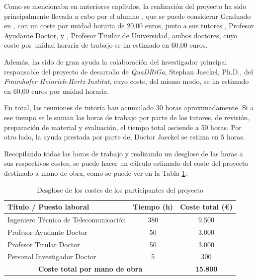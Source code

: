 Como se mencionaba en anteriores capítulos, la realización del proyecto ha sido principalmente llevada a cabo por el alumno \myName, que se puede considerar Graduado en \myDegree, con un coste por unidad horaria de 20,00 euros, junto a sus tutores \myProf, Profesor Ayudante Doctor, y \myOtherProf, Profesor Titular de Universidad, ambos doctores, cuyo coste por unidad horaria de trabajo se ha estimado en 60,00 euros.

Además, ha sido de gran ayuda la colaboración del investigador principal responsable del proyecto de desarrollo de \textit{QuaDRiGa}, Stephan Jaeckel, Ph.D., del \textit{Fraunhofer Heinrich-Hertz-Institut}, cuyo coste, del mismo modo, se ha estimado en 60,00 euros por unidad horaria.

En total, las reuniones de tutoría han acumulado 30 horas aproximadamente. Si a ese tiempo se le suman las horas de trabajo por parte de los tutores, de revisión, preparación de material y evaluación, el tiempo total asciende a 50 horas. Por otro lado, la ayuda prestada por parte del Doctor Jaeckel se estima en 5 horas.

Recopilando todas las horas de trabajo y realizando un desglose de las horas a sus respectivos costes, se puede hacer un cálculo estimado del coste del proyecto destinado a mano de obra, como se puede ver en la Tabla \ref{tab:sueldos}:

\begin{table}[h!]
\centering
\caption{Desglose de los costes de los participantes del proyecto}
\label{tab:sueldos}
\begin{tabular}{|m{5cm}|c|c|}
\hline
\textbf{Título / Puesto laboral}        & \multicolumn{1}{l|}{\textbf{Tiempo (h)}} & \multicolumn{1}{l|}{\textbf{Coste total (\euro)}} \\ \hline
Ingeniero Técnico de Telecomunicación & 380                                      & 9.500                                         \\ \hline
Profesor Ayudante Doctor                & 50                                       & 3.000                                         \\ \hline
Profesor Titular Doctor                 & 50                                       & 3.000                                         \\ \hline
Personal Investigador Doctor            & 5                                        & 300                                           \\ \hline
\multicolumn{2}{|c|}{\textbf{Coste total por mano de obra}}                        & \textbf{15.800}                               \\ \hline
\end{tabular}
\end{table}

